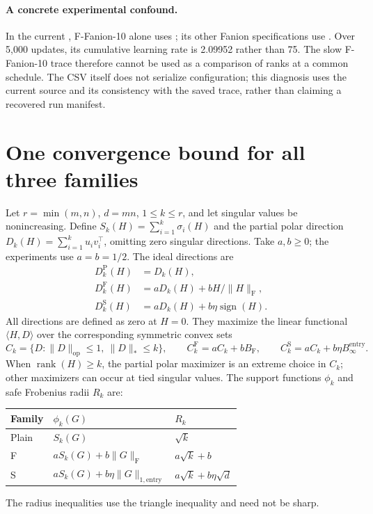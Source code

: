 \documentclass[11pt]{article}
\newcommand{\ip}[2]{\langle #1,#2\rangle}
\newcommand{\F}[1]{\lVert #1\rVert_{\mathrm F}}
\newcommand{\nuc}[1]{\lVert #1\rVert_*}
\newcommand{\op}[1]{\lVert #1\rVert_{\mathrm{op}}}
\newcommand{\ent}[1]{\lVert #1\rVert_{1,\mathrm{entry}}}
\newcommand{\sgn}{\operatorname{sign}}
\newcommand{\rank}{\operatorname{rank}}
\begin{document}
\paragraph{A concrete experimental confound.}
In the current ,
F-Fanion-10 alone uses ; its other Fanion specifications
use . Over 5,000 updates, its cumulative learning rate is
2.09952 rather than 75. The slow F-Fanion-10 trace therefore cannot be used
as a comparison of ranks at a common schedule. The CSV itself does not
serialize configuration; this diagnosis uses the current source and its
consistency with the saved trace, rather than claiming a recovered run manifest.

\section{One convergence bound for all three families}\label{sec:unified}

Let $r=\min(m,n)$, $d=mn$, $1\leq k\leq r$, and let singular values be nonincreasing. Define
$S_k(H)=\sum_{i=1}^k\sigma_i(H)$ and the partial polar direction
$D_k(H)=\sum_{i=1}^k u_i v_i^\top$, omitting zero singular directions.
Take $a,b\geq0$; the experiments use $a=b=1/2$. The ideal directions are
\begin{equation}\label{eq:directions}
\begin{aligned}
 D_k^{\mathrm{P}}(H)&=D_k(H),\\
 D_k^{\mathrm{F}}(H)&=aD_k(H)+bH/\F{H},\\
 D_k^{\mathrm{S}}(H)&=aD_k(H)+b\eta\sgn(H).
\end{aligned}
\end{equation}
All directions are defined as zero at $H=0$. They maximize the linear
functional $\ip{H}{D}$ over the corresponding symmetric convex sets
\[
 C_k=\{D:\op{D}\leq1,\ \nuc{D}\leq k\},\qquad
 C_k^{\mathrm{F}}=aC_k+bB_{\mathrm{F}},\qquad
 C_k^{\mathrm{S}}=aC_k+b\eta B_\infty^{\mathrm{entry}}.
\]
When $\rank(H)\geq k$, the partial polar maximizer is an extreme choice in
$C_k$; other maximizers can occur at tied singular values.
The support functions $\phi_k$ and safe
Frobenius radii $R_k$ are:
\begin{center}
\begin{tabular}{lll}
\toprule
Family & $\phi_k(G)$ & $R_k$\\
\midrule
Plain & $S_k(G)$ & $\sqrt{k}$\\
F & $aS_k(G)+b\F{G}$ & $a\sqrt{k}+b$\\
S & $aS_k(G)+b\eta\ent{G}$ & $a\sqrt{k}+b\eta\sqrt{d}$\\
\bottomrule
\end{tabular}
\end{center}
The radius inequalities use the triangle inequality and need not be sharp.
\end{document}
